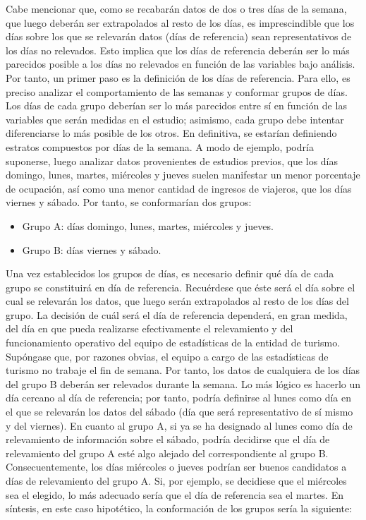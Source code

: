\documentclass[
]{book}
\begin{document}
Cabe mencionar que, como se recabarán datos de dos o tres días de la semana, que luego deberán ser extrapolados al resto de los días, es imprescindible que los días sobre los que se relevarán datos (días de referencia) sean representativos de los días no relevados. Esto implica que los días de referencia deberán ser lo más parecidos posible a los días no relevados en función de las variables bajo análisis. Por tanto, un primer paso es la definición de los días de referencia. Para ello, es preciso analizar el comportamiento de las semanas y conformar grupos de días. Los días de cada grupo deberían ser lo más parecidos entre sí en función de las variables que serán medidas en el estudio; asimismo, cada grupo debe intentar diferenciarse lo más posible de los otros. En definitiva, se estarían definiendo estratos compuestos por días de la semana. A modo de ejemplo, podría suponerse, luego analizar datos provenientes de estudios previos, que los días domingo, lunes, martes, miércoles y jueves suelen manifestar un menor porcentaje de ocupación, así como una menor cantidad de ingresos de viajeros, que los días viernes y sábado. Por tanto, se conformarían dos grupos:

\begin{itemize}
\item
  Grupo A: días domingo, lunes, martes, miércoles y jueves.
\item
  Grupo B: días viernes y sábado.
\end{itemize}

Una vez establecidos los grupos de días, es necesario definir qué día de cada grupo se constituirá en día de referencia. Recuérdese que éste será el día sobre el cual se relevarán los datos, que luego serán extrapolados al resto de los días del grupo. La decisión de cuál será el día de referencia dependerá, en gran medida, del día en que pueda realizarse efectivamente el relevamiento y del funcionamiento operativo del equipo de estadísticas de la entidad de turismo. Supóngase que, por razones obvias, el equipo a cargo de las estadísticas de turismo no trabaje el fin de semana. Por tanto, los datos de cualquiera de los días del grupo B deberán ser relevados durante la semana. Lo más lógico es hacerlo un día cercano al día de referencia; por tanto, podría definirse al lunes como día en el que se relevarán los datos del sábado (día que será representativo de sí mismo y del viernes). En cuanto al grupo A, si ya se ha designado al lunes como día de relevamiento de información sobre el sábado, podría decidirse que el día de relevamiento del grupo A esté algo alejado del correspondiente al grupo B. Consecuentemente, los días miércoles o jueves podrían ser buenos candidatos a días de relevamiento del grupo A. Si, por ejemplo, se decidiese que el miércoles sea el elegido, lo más adecuado sería que el día de referencia sea el martes. En síntesis, en este caso hipotético, la conformación de los grupos sería la siguiente:
\end{document}
